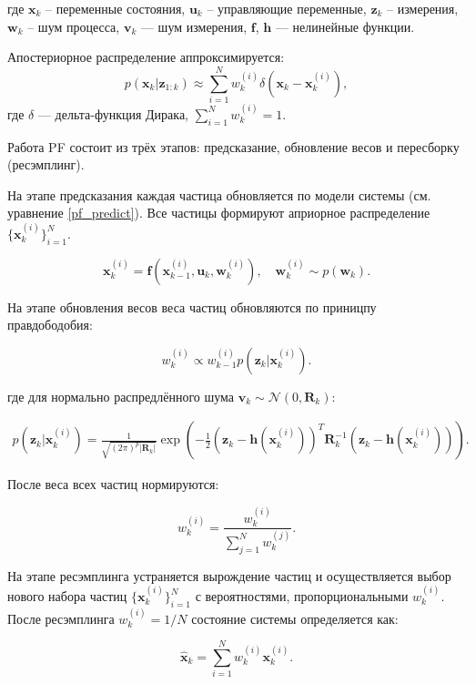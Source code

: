 где \(\mathbf{x}_k\) -- переменные состояния, \(\mathbf{u}_k\) -- управляющие переменные,
\(\mathbf{z}_k\) -- измерения,
\(\mathbf{w}_k\) -- шум процесса,
\(\mathbf{v}_k\) — шум измерения,
\(\mathbf{f}\), \(\mathbf{h}\) — нелинейные функции. 

Апостериорное распределение аппроксимируется:
\begin{equation}
    p(\mathbf{x}_k | \mathbf{z}_{1:k}) \approx \sum_{i=1}^N w_k^{(i)} \delta(\mathbf{x}_k - \mathbf{x}_k^{(i)}),
\end{equation}
где \(\delta\) — дельта-функция Дирака, \(\sum_{i=1}^N w_k^{(i)} = 1\).


Работа PF состоит из трёх этапов: предсказание, обновление весов и пересборку (ресэмплинг).

На этапе предсказания каждая частица обновляется по модели системы (см. уравнение \ref{pf_predict}).
Все частицы формируют априорное распределение \(\{\mathbf{x}_k^{(i)}\}_{i=1}^N\).

\begin{equation}
	\mathbf{x}_k^{(i)} = \mathbf{f}(\mathbf{x}_{k-1}^{(i)}, \mathbf{u}_k, \mathbf{w}_k^{(i)}), \quad \mathbf{w}_k^{(i)} \sim p(\mathbf{w}_k). \label{pf_predict}
\end{equation}


На этапе обновления весов веса частиц обновляются по приницпу правдободобия:

\begin{equation}
	w_k^{(i)} \propto w_{k-1}^{(i)} p(\mathbf{z}_k | \mathbf{x}_k^{(i)}).
\end{equation}

где для нормально распредлённого шума \(\mathbf{v}_k \sim \mathcal{N}(0, \mathbf{R}_k)\):

\begin{align}
    p(\mathbf{z}_k | \mathbf{x}_k^{(i)}) = \frac{1}{\sqrt{(2\pi)^p |\mathbf{R}_k|}} \exp\left(-\frac{1}{2} (\mathbf{z}_k - \mathbf{h}(\mathbf{x}_k^{(i)}))^T \mathbf{R}_k^{-1} (\mathbf{z}_k - \mathbf{h}(\mathbf{x}_k^{(i)}))\right).
\end{align}

После веса всех частиц нормируются:

\begin{equation}
    w_k^{(i)} = \frac{w_k^{(i)}}{\sum_{j=1}^N w_k^{(j)}}.
\end{equation}

На этапе ресэмплинга устраняется вырождение частиц
и осуществляется выбор нового набора частиц \(\{\mathbf{x}_k^{(i)}\}_{i=1}^N\) с вероятностями,
пропорциональными \(w_k^{(i)}\). После ресэмплинга \(w_k^{(i)} = 1/N\) состояние системы 
определяется как:

\begin{equation}
    \hat{\mathbf{x}}_k = \sum_{i=1}^N w_k^{(i)} \mathbf{x}_k^{(i)}.
\end{equation}
